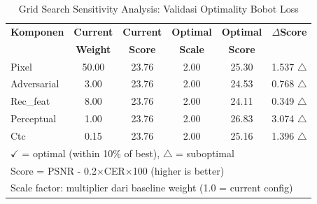
\begin{table}[H]
\centering
\caption{Grid Search Sensitivity Analysis: Validasi Optimality Bobot Loss}
\label{tab:grid-search-sensitivity}
\footnotesize
\begin{tabular}{lccccc}
\hline
\textbf{Komponen} & \textbf{Current} & \textbf{Current} & \textbf{Optimal} & \textbf{Optimal} & \textbf{$\Delta$Score} \\
& \textbf{Weight} & \textbf{Score} & \textbf{Scale} & \textbf{Score} & \\
\hline
Pixel & 50.00 & 23.76 & 2.00 & 25.30 & 1.537 $\triangle$ \\
Adversarial & 3.00 & 23.76 & 2.00 & 24.53 & 0.768 $\triangle$ \\
Rec_feat & 8.00 & 23.76 & 2.00 & 24.11 & 0.349 $\triangle$ \\
Perceptual & 1.00 & 23.76 & 2.00 & 26.83 & 3.074 $\triangle$ \\
Ctc & 0.15 & 23.76 & 2.00 & 25.16 & 1.396 $\triangle$ \\
\hline
\multicolumn{6}{l}{\footnotesize $\checkmark$ = optimal (within 10\% of best), $\triangle$ = suboptimal} \\
\multicolumn{6}{l}{\footnotesize Score = PSNR - 0.2$\times$CER$\times$100 (higher is better)} \\
\multicolumn{6}{l}{\footnotesize Scale factor: multiplier dari baseline weight (1.0 = current config)} \\
\end{tabular}
\end{table}
